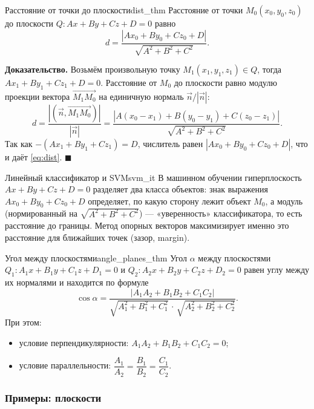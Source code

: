 \documentclass[12pt,a4paper]{article}
\newenvironment{myproof}{\noindent\textbf{Доказательство.}}{\hfill$\blacksquare$}
\begin{document}
\begin{theorem}{Расстояние от точки до плоскости}{dist_thm}
  Расстояние от точки $M_0(x_0,y_0,z_0)$ до плоскости
  $Q\colon Ax + By + Cz + D = 0$ равно
  \begin{equation}
    d = \frac{|Ax_0 + By_0 + Cz_0 + D|}{\sqrt{A^2 + B^2 + C^2}}.
    \tag{10.6}\label{eq:dist}
  \end{equation}
\end{theorem}

\begin{myproof}
  Возьмём произвольную точку $M_1(x_1,y_1,z_1) \in Q$, тогда
  $Ax_1 + By_1 + Cz_1 + D = 0$. Расстояние от $M_0$ до плоскости равно
  модулю проекции вектора $\overrightarrow{M_1M_0}$ на единичную
  нормаль $\vec{n}/|\vec{n}|$:
  \[
    d = \frac{|(\vec{n}, \overrightarrow{M_1M_0})|}{|\vec{n}|}
    = \frac{|A(x_0-x_1) + B(y_0-y_1) + C(z_0-z_1)|}{\sqrt{A^2+B^2+C^2}}.
  \]
  Так как $-(Ax_1+By_1+Cz_1) = D$, числитель равен $|Ax_0+By_0+Cz_0+D|$,
  что и даёт \eqref{eq:dist}.
\end{myproof}

\begin{remarkIT}{Линейный классификатор и SVM}{svm_it}
  В машинном обучении гиперплоскость $Ax+By+Cz+D=0$ разделяет два
  класса объектов: знак выражения $Ax_0+By_0+Cz_0+D$ определяет, по
  какую сторону лежит объект $M_0$, а модуль (нормированный на
  $\sqrt{A^2+B^2+C^2}$) --- «уверенность» классификатора, то есть
  расстояние до границы. Метод опорных векторов максимизирует именно
  это расстояние для ближайших точек (зазор, margin).
\end{remarkIT}

\begin{theorem}{Угол между плоскостями}{angle_planes_thm}
  Угол $\alpha$ между плоскостями
  $Q_1\colon A_1x + B_1y + C_1z + D_1 = 0$ и
  $Q_2\colon A_2x + B_2y + C_2z + D_2 = 0$ равен углу между их
  нормалями и находится по формуле
  \[
    \cos\alpha = \frac{|A_1A_2 + B_1B_2 + C_1C_2|}
    {\sqrt{A_1^2+B_1^2+C_1^2}\,\cdot\,\sqrt{A_2^2+B_2^2+C_2^2}}.
  \]
  При этом:
  \begin{itemize}
    \item условие перпендикулярности:
      $A_1A_2 + B_1B_2 + C_1C_2 = 0$;
    \item условие параллельности:
      $\dfrac{A_1}{A_2} = \dfrac{B_1}{B_2} = \dfrac{C_1}{C_2}$.
  \end{itemize}
\end{theorem}

\subsubsection*{Примеры: плоскости}
\end{document}
